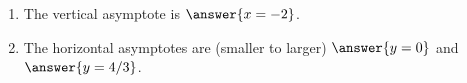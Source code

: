 \documentclass{ximera}
\begin{document}
\begin{exercise}
\begin{enumerate}
\begin{exercise}
\begin{enumerate}
\item The vertical asymptote is $\answer{x=-2}$.

\item The horizontal asymptotes are (smaller to larger) $\answer{y=0}$ and $\answer{y=4/3}$.
\end{enumerate}
\end{exercise}

%
%
%
%
%

\end{enumerate}
\end{exercise}
\end{document}
